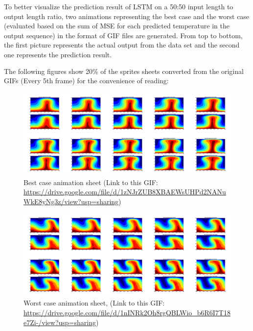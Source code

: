 To better visualize the prediction result of LSTM on a 50:50 input length to output length ratio, two animations representing the best case and the worst case (evaluated based on the sum of MSE for each predicted temperature in the output sequence) in the format of GIF files are generated. From top to bottom, the first picture represents the actual output from the data set and the second one represents the prediction result.

The following figures show 20\% of the sprites sheets converted from the original GIFs (Every 5th frame) for the convenience of reading:

\begin{figure}[H]
    \centering
    \caption{Best case animation sheet (Link to this GIF: \url{https://drive.google.com/file/d/1zNJrZUB8XBAEWsUHPd2NANuWkE8yNg3z/view?usp=sharing})}
    \includegraphics[scale=0.10]{Report LaTeX/figures/mantle_convection_images/limited_dataset/LSTM_Best_GIF_sheet.png}
\end{figure}



\begin{figure}[H]
    \centering
    \caption{Worst case animation sheet, (Link to this GIF: 
    \url{https://drive.google.com/file/d/1nINRk2Oh8rgQBLWio_b6R6I7T18e7Zi-/view?usp=sharing})}
    \includegraphics[scale=0.10]{Report LaTeX/figures/mantle_convection_images/limited_dataset/LSTM_Worst_GIF_sheet.png}
\end{figure}

